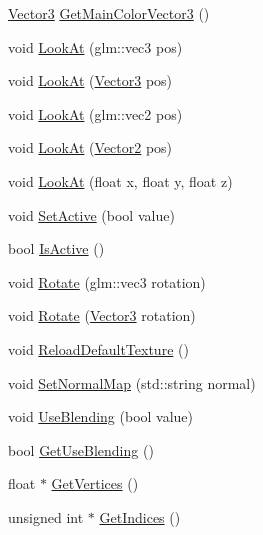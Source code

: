 \begin{DoxyCompactItemize}
\item 
\mbox{\hyperlink{struct_vector3}{Vector3}} \mbox{\hyperlink{class_game_object_af68f8296127c57c48ae14e52186a4549}{Get\+Main\+Color\+Vector3}} ()
\item 
void \mbox{\hyperlink{class_game_object_a1ba510555d772c1bd90c367af5170527}{Look\+At}} (glm\+::vec3 pos)
\item 
void \mbox{\hyperlink{class_game_object_a0f791ccc7199b037943e3df61e54388f}{Look\+At}} (\mbox{\hyperlink{struct_vector3}{Vector3}} pos)
\item 
void \mbox{\hyperlink{class_game_object_ab6fc8c1ac5466de9b4daba280409cb16}{Look\+At}} (glm\+::vec2 pos)
\item 
void \mbox{\hyperlink{class_game_object_a806d41ea17cfb5cd02def9b6d3942249}{Look\+At}} (\mbox{\hyperlink{struct_vector2}{Vector2}} pos)
\item 
void \mbox{\hyperlink{class_game_object_a54974c5e887f6a8873c8ee861a0c9e5f}{Look\+At}} (float x, float y, float z)
\item 
void \mbox{\hyperlink{class_game_object_af1658a9e25a85058f801211dde34281c}{Set\+Active}} (bool value)
\item 
bool \mbox{\hyperlink{class_game_object_a69b8f6ffe839e09eb0a0fea12659847d}{Is\+Active}} ()
\item 
void \mbox{\hyperlink{class_game_object_ac1f6c8881fe4185a1a2bca08ad252660}{Rotate}} (glm\+::vec3 rotation)
\item 
void \mbox{\hyperlink{class_game_object_a93d2bb0c555fe8bb6323f9a4827f7a46}{Rotate}} (\mbox{\hyperlink{struct_vector3}{Vector3}} rotation)
\item 
void \mbox{\hyperlink{class_game_object_a007ca9940b38a71eae51efefda676e4f}{Reload\+Default\+Texture}} ()
\item 
void \mbox{\hyperlink{class_game_object_a96b709620f150364772eeba91870f34f}{Set\+Normal\+Map}} (std\+::string normal)
\item 
void \mbox{\hyperlink{class_game_object_ab9c811db96001705309dcb7951ca5252}{Use\+Blending}} (bool value)
\item 
bool \mbox{\hyperlink{class_game_object_a2397a73d6940e1e4c78bccccc5531788}{Get\+Use\+Blending}} ()
\item 
float $\ast$ \mbox{\hyperlink{class_game_object_acd61e0ec39b7130ce29f8b4d89983f26}{Get\+Vertices}} ()
\item 
unsigned int $\ast$ \mbox{\hyperlink{class_game_object_a64538a684f696603ee20d1a02cabce9f}{Get\+Indices}} ()
\item 

\end{DoxyCompactItemize}

